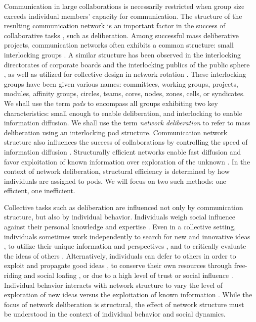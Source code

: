 \documentclass[twocolumn,10pt]{article}
\begin{document}
Communication in large collaborations is necessarily restricted when group size exceeds individual members' capacity for communication. The structure of the resulting communication network is an important factor in the success of collaborative tasks \cite{kearns_experiments_2012, mason_collaborative_2012, mason_propagation_2008}, such as deliberation. Among successful mass deliberative projects, communication networks often exhibits a common structure: small interlocking groups \cite{benkler_coases_2002, gonzalez-bailon_networked_2016, brugh_combining_2019, laloux_reinventing_2014}. A similar structure has been observed in the interlocking directorates of corporate boards \cite{karau_social_1993} and the interlocking publics of the public sphere \cite{habermas_structural_1991}, as well as utilized for collective design in network rotation \cite{salehi_hive_2018}.
These interlocking groups have been given various names: committees, working groups, projects, modules, affinity groups, circles, teams, cores, nodes, zones, cells, or syndicates.
We shall use the term {\em pods} to encompass all groups exhibiting two key characteristics: small enough to enable deliberation, and interlocking to enable information diffusion.
We shall use the term {\em network deliberation} to refer to mass deliberation using an interlocking pod structure.
Communication network structure also influences the success of collaborations by controlling the speed of information diffusion \cite{lazer_network_2007,mason_propagation_2008,mason_collaborative_2012,barkoczi_social_2016, gomez_clustering_2019,derex_partial_2016,kearns_experiments_2012}. Structurally efficient networks enable fast diffusion and favor exploitation of known information over exploration of the unknown \cite{lazer_network_2007, barkoczi_social_2016}. In the context of network deliberation, structural efficiency is determined by how individuals are assigned to pods.
We will focus on two such methods: one efficient, one inefficient.

Collective tasks such as deliberation are influenced not only by communication structure, but also by individual behavior. Individuals weigh social influence against their personal knowledge and expertise  \cite{boyd_culture_1988}. 
Even in a collective setting, individuals sometimes work independently to search for new and innovative ideas \cite{lazer_network_2007, barkoczi_social_2016}, to utilize their unique information and perspectives \cite{hong_interpreted_2009}, and to critically evaluate the ideas of others \cite{rendell_rogersparadox_2010}.
Alternatively, individuals can defer to others in order to exploit and propagate good ideas \cite{barkoczi_social_2016, boyd_culture_1988}, to conserve their own resources through free-riding and social loafing \cite{karau_social_1993}, or due to a high level of trust \cite{salehi_hive_2018} or social influence \cite{banerjee_simple_1992, smith_pathological_2000}. Individual behavior interacts with network structure to vary the level of exploration of new ideas versus the exploitation of known information \cite{barkoczi_social_2016}. While the focus of network deliberation is structural, the effect of network structure must be understood in the context of individual behavior and social dynamics.
\end{document}
